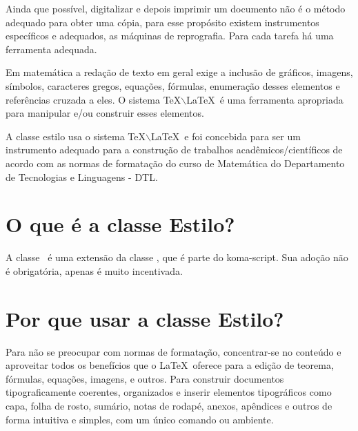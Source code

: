 \introducao

Ainda que possível, digitalizar e depois imprimir um documento não é o método
adequado para obter uma cópia, para esse propósito existem instrumentos específicos e adequados, as máquinas de reprografia. Para cada tarefa há uma ferramenta adequada.

Em matemática a redação de texto em geral exige a inclusão de gráficos, imagens, símbolos, caracteres gregos, equações, fórmulas, enumeração desses elementos e referências cruzada a eles. O sistema \TeX$\backslash$\LaTeX\ é uma ferramenta
apropriada para manipular e/ou construir esses elementos.

A classe estilo usa o sistema \TeX$\backslash$\LaTeX\ e foi concebida para ser um
instrumento adequado para a construção de trabalhos acadêmicos/científicos de acordo com as normas de formatação do curso de Matemática do Departamento de Tecnologias e Linguagens - DTL.

\section*{O que é a classe Estilo?}

A classe \estilo\ é uma extensão da classe , que é parte do koma-script. Sua adoção não é obrigatória, apenas é muito incentivada.

\section*{Por que usar a classe Estilo?}

Para não se preocupar com normas de formatação, concentrar-se no conteúdo e
aproveitar todos os benefícios que o \LaTeX\ oferece para a edição
de teorema, fórmulas, equações, imagens, e outros. Para construir documentos tipograficamente coerentes, organizados e inserir elementos tipográficos como capa, folha de rosto, sumário, notas de rodapé, anexos, apêndices e outros
de forma intuitiva e simples, com um único comando ou ambiente.

\ajuste %